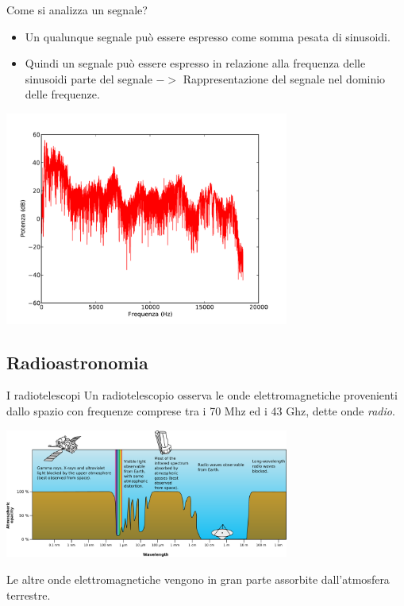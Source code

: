 \documentclass[red]{beamer}
\begin{document}
\begin{frame}{Come si analizza un segnale?}
	\transdissolve<4>
	\begin{itemize}
		\item Un qualunque segnale pu\`o essere espresso come somma pesata di
			sinusoidi. \pause
		\item Quindi un segnale pu\`o essere espresso in relazione alla frequenza
			delle sinusoidi parte del segnale \pause $->$ Rappresentazione del segnale nel
			dominio delle frequenze. \pause
	\end{itemize}
	\begin{center}
		\includegraphics[width=0.7\textwidth]{img/frequenza}
	\end{center}
\end{frame}

\subsection{Radioastronomia}
\begin{frame}{I radiotelescopi}
	Un radiotelescopio osserva le onde elettromagnetiche provenienti dallo spazio
	con frequenze comprese tra i 70 Mhz ed i 43 Ghz, dette onde
	\emph{radio}.
	\begin{center}
		\includegraphics[width=0.7\textwidth]{img/Atmospheric_electromagnetic_opacity}
	\end{center}
	Le altre onde elettromagnetiche vengono in gran parte assorbite dall'atmosfera
	terrestre.
\end{frame}
\end{document}
